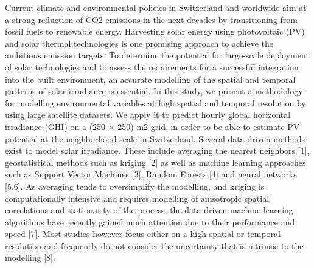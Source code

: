 Current climate and environmental policies in Switzerland and worldwide aim at a strong reduction of CO2 emissions in the next decades by transitioning from fossil fuels to renewable energy. Harvesting solar energy using photovoltaic (PV) and solar thermal technologies is one promising approach to achieve the ambitious emission targets. To determine the potential for large-scale deployment of solar technologies and to assess the requirements for a successful integration into the built environment, an accurate modelling of the spatial and temporal patterns of solar irradiance is essential. In this study, we present a methodology for modelling environmental variables at high spatial and temporal resolution by using large satellite datasets. We apply it to predict hourly global horizontal irradiance (GHI) on a (250 $\times$ 250) m2 grid, in order to be able to estimate PV potential at the neighborhood scale in Switzerland. 
Several data-driven methods exist to model solar irradiance. These include averaging the nearest neighbors [1], geostatistical methods such as kriging [2] as well as machine learning approaches such as Support Vector Machines [3], Random Forests [4] and neural networks [5,6]. As averaging tends to oversimplify the modelling, and kriging is computationally intensive and requires modelling of anisotropic spatial correlations and stationarity of the process, the data-driven machine learning algorithms have recently gained much attention due to their performance and speed [7]. Most studies however focus either on a high spatial or temporal resolution and frequently do not consider the uncertainty that is intrinsic to the modelling [8]. 

